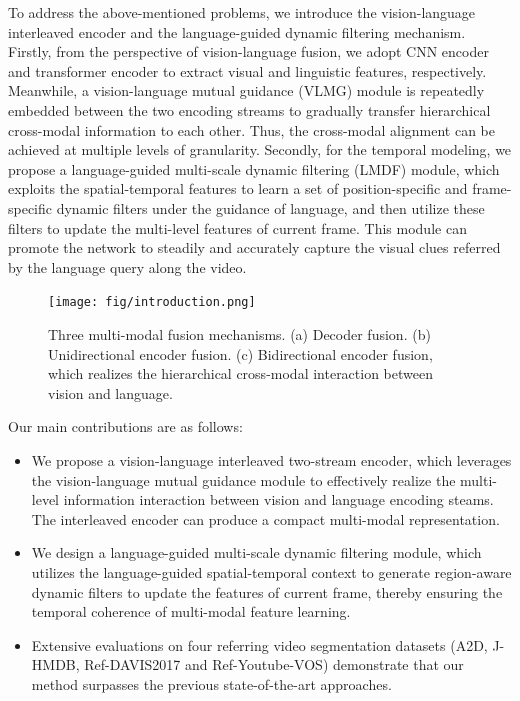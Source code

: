\documentclass[10pt,twocolumn,letterpaper]{article}
\begin{document}
To address the above-mentioned problems, we introduce the vision-language interleaved encoder and the language-guided dynamic filtering mechanism. Firstly, from the perspective
of vision-language fusion, we adopt CNN encoder and transformer encoder to extract visual and linguistic features, respectively. Meanwhile, a vision-language mutual guidance (VLMG) module is repeatedly embedded between the two encoding streams to gradually transfer hierarchical cross-modal information to each other. Thus, the cross-modal alignment can be achieved at multiple levels of granularity. Secondly, for the temporal modeling, we propose a language-guided multi-scale dynamic filtering (LMDF) module, which exploits the spatial-temporal features to learn a set of position-specific and frame-specific dynamic filters under the guidance of language, and then utilize these filters to update the multi-level features of current frame. This module can promote the network to steadily and accurately capture the visual clues referred by the language query along the video.

\begin{figure}[t]
\vspace{0mm}
\texttt{[image: fig/introduction.png]}
\ \\
{\begin{center}
\vspace{-12mm}
\caption{\small{Three multi-modal fusion mechanisms. (a) Decoder fusion. (b) Unidirectional encoder fusion. (c) Bidirectional encoder fusion, which realizes the hierarchical cross-modal interaction between vision and language.
}}
\label{fig:introduction}
\end{center}
}
\vspace{-3mm}
\end{figure}


Our main contributions are as follows:
\vspace{0mm}
\begin{itemize}
\vspace{-0mm}
\item We propose a vision-language interleaved two-stream encoder, which leverages the vision-language mutual guidance module to effectively realize the multi-level information interaction between vision and language encoding steams. The interleaved encoder can produce a compact multi-modal representation.
\vspace{-0mm}
\item We design a language-guided multi-scale dynamic filtering module, which utilizes the language-guided spatial-temporal context to generate region-aware dynamic filters to update the features of current frame, thereby ensuring the temporal coherence of multi-modal feature learning.
\vspace{-0mm}
\item Extensive evaluations on four referring video segmentation datasets (A2D, J-HMDB, Ref-DAVIS2017 and Ref-Youtube-VOS) demonstrate that our method surpasses the previous state-of-the-art approaches.
\end{itemize}
\end{document}
